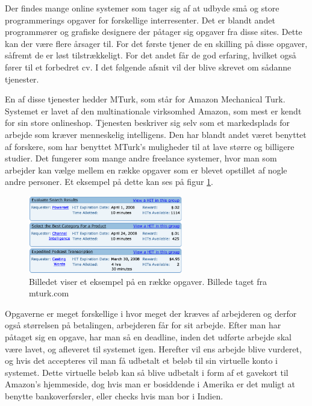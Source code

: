 Der findes mange online systemer som tager sig af at udbyde små og store programmerings opgaver for forskellige interresenter. Det er blandt andet programmører og grafiske designere der påtager sig opgaver fra disse sites. Dette kan der være flere årsager til. For det første tjener de en skilling på disse opgaver, såfremt de er løst tilstrækkeligt. For det andet får de god erfaring, hvilket også fører til et forbedret cv. I det følgende afsnit vil der blive skrevet om sådanne tjenester.

En af disse tjenester hedder MTurk, som står for Amazon Mechanical Turk. Systemet er lavet af den multinationale virksomhed Amazon, som mest er kendt for sin store onlineshop. Tjenesten beskriver sig selv som et markedsplads for arbejde som kræver menneskelig intelligens.\cite{MTurk} Den har blandt andet været benyttet af forskere, som har benyttet MTurk's muligheder til at lave større og billigere studier.\cite{Sciencemag} Det fungerer som mange andre freelance systemer, hvor man som arbejder kan vælge mellem en række opgaver som er blevet opstillet af nogle andre personer. Et eksempel på dette kan ses på figur \ref{MTurkILL}.

\begin{figure}[htb]
\centering
\includegraphics[width=0.6\textwidth]{Billeder/MTurk.png}
\caption{Billedet viser et eksempel på en række opgaver. Billede taget fra mturk.com\cite{MTurkIMG}}
\label{MTurkILL}
\end{figure}

Opgaverne er meget forskellige i hvor meget der kræves af arbejderen og derfor også størrelsen på betalingen, arbejderen får for sit arbejde. Efter man har påtaget sig en opgave, har man så en deadline, inden det udførte arbejde skal være lavet, og afleveret til systemet igen. Herefter vil ens arbejde blive vurderet, og hvis det accepteres vil man få udbetalt et beløb til sin virtuelle konto i systemet. Dette virtuelle beløb kan så blive udbetalt i form af et gavekort til Amazon’s hjemmeside, dog hvis man er bosiddende i Amerika er det muligt at benytte bankoverførsler, eller checks hvis man bor i Indien.\cite{MTurk2}

